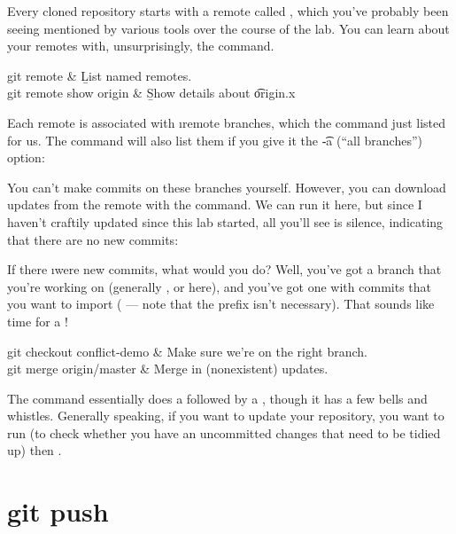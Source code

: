 \documentclass[letterpaper,12pt,titlepage,twoside]{article}
\begin{document}
Every cloned repository starts with a remote called , which you've
probably been seeing mentioned by various tools over the course of the lab.
You can learn about your remotes with, unsurprisingly, the 
command.

\begin{typeme}
git remote & \b{List named remotes.} \\
git remote show origin & \b{Show details about \t{origin}.}x
\end{typeme}

Each remote is associated with \i{remote branches}, which the  command just listed for us. The  command will also list
them if you give it the \t{-a} (``all branches'') option:


You can't make commits on these branches yourself. However, you can download
updates from the remote with the  command. We can run it here, but
since I haven't craftily updated  since this lab started, all you'll
see is silence, indicating that there are no new commits:


If there \i{were} new commits, what would you do? Well, you've got a branch
that you're working on (generally , or  here), and
you've got one with commits that you want to import ( ---
note that the  prefix isn't necessary). That sounds like time for
a !

\begin{typeme}
git checkout conflict-demo & Make sure we're on the right branch. \\
git merge origin/master & Merge in (nonexistent) updates.
\end{typeme}

The command  essentially does a  followed by a
, though it has a few bells and whistles. Generally speaking, if
you want to update your repository, you want to run  (to check
whether you have an uncommitted changes that need to be tidied up) then
.



\section{git push}
\end{document}
